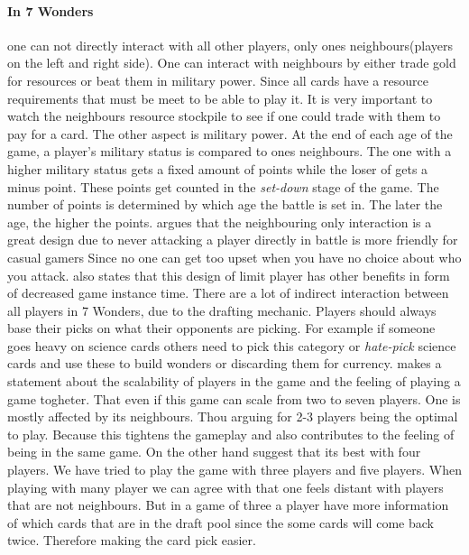 \documentclass[a4paper]{article}
\begin{document}
\paragraph{In 7 Wonders} one can not directly interact with all other players, only ones neighbours(players on the left and right side).
One can interact with neighbours by either trade gold for resources or beat them in military power.
Since all cards have a resource requirements that must be meet to be able to play it.
It is very important to watch the neighbours resource stockpile to see if one could trade with them to pay for a card.
The other aspect is military power.
At the end of each age of the game, a player's military status is compared to ones neighbours.
The one with a higher military status gets a fixed amount of points while the loser of gets a minus point.
These points get counted in the \textit{set-down} stage of the game. The number of points is determined by which age the battle is set in.
The later the age, the higher the points. 
 argues that the neighbouring only interaction is a great design due to never attacking a player directly in battle is more friendly for casual gamers Since no one can get too upset when you have no choice about who you attack. \citeauthor{notsacgame7wond} also states that this design of limit player has other benefits in form of decreased game instance time.
There are a lot of indirect interaction between all players in 7 Wonders, due to the drafting mechanic. Players should always base their picks on what their opponents are picking.
For example if someone goes heavy on science cards others need to pick this category or \textit{hate-pick} science cards and use these to build wonders or discarding them for currency.
 makes a statement about the scalability of players in the game and the feeling of playing a game togheter.
That even if this game can scale from two to seven players. One is mostly affected by its neighbours.
Thou arguing for 2-3 players being the optimal to play.
Because this tightens the gameplay and also contributes to the feeling of being in the same game.
On the other hand  suggest that its best with four players.
We have tried to play the game with three players and five players.
When playing with many player we can agree with \citeauthor{critical7wond} that one feels distant with players that are not neighbours.
But in a game of three a player have more information of which cards that are in the draft pool since the some cards will come back twice. Therefore making the card pick easier. 
\end{document}
